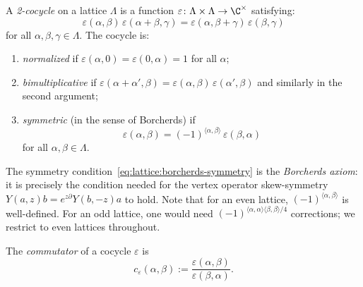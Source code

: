 \begin{definition}\label{def:lattice:2-cocycle}
A \emph{2-cocycle} on a lattice $\Lambda$ is a function
$\varepsilon \colon \Lambda \times \Lambda \to \C^\times$ satisfying:
\begin{equation}\label{eq:lattice:cocycle-condition}
\varepsilon(\alpha, \beta)\,\varepsilon(\alpha + \beta, \gamma)
= \varepsilon(\alpha, \beta + \gamma)\,\varepsilon(\beta, \gamma)
\end{equation}
for all $\alpha, \beta, \gamma \in \Lambda$.
The cocycle is:
\begin{enumerate}[label=(\roman*)]
\item \emph{normalized} if
 $\varepsilon(\alpha, 0) = \varepsilon(0, \alpha) = 1$ for all $\alpha$;
\item \emph{bimultiplicative} if
 $\varepsilon(\alpha + \alpha', \beta) =
 \varepsilon(\alpha, \beta)\,\varepsilon(\alpha', \beta)$
 and similarly in the second argument;
\item \emph{symmetric} (in the sense of Borcherds) if
\begin{equation}\label{eq:lattice:borcherds-symmetry}
\varepsilon(\alpha, \beta)
= (-1)^{\langle \alpha, \beta \rangle}\,\varepsilon(\beta, \alpha)
\end{equation}
for all $\alpha, \beta \in \Lambda$.
\end{enumerate}
\end{definition}

\begin{remark}\label{rem:lattice:symmetry-convention}
The symmetry condition~\eqref{eq:lattice:borcherds-symmetry} is the
\emph{Borcherds axiom}: it is precisely the condition needed for the
vertex operator skew-symmetry $Y(a,z)b = e^{z\partial}Y(b,-z)a$ to hold.
Note that for an even lattice, $(-1)^{\langle\alpha,\beta\rangle}$
is well-defined. For an odd lattice, one would need
$(-1)^{\langle\alpha,\alpha\rangle\langle\beta,\beta\rangle/4}$
corrections; we restrict to even lattices throughout.
\end{remark}

\begin{definition}\label{def:lattice:commutator}
The \emph{commutator} of a cocycle $\varepsilon$ is
\[
c_\varepsilon(\alpha, \beta)
:= \frac{\varepsilon(\alpha, \beta)}{\varepsilon(\beta, \alpha)}.
\]
\end{definition}

